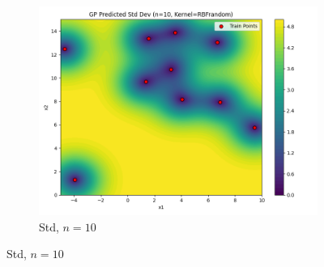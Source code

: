 \documentclass[a4paper,12pt]{article}
\begin{document}
\begin{figure}[H]
\begin{subfigure}{0.3\textwidth}
\end{subfigure}
\begin{subfigure}{0.3\textwidth}
    \includegraphics[width=\linewidth]{Task-02/images/gp_std_rbf_n10_random.png}
    \caption{Std, $n=10$}
\end{subfigure}


\end{figure}
\end{document}
